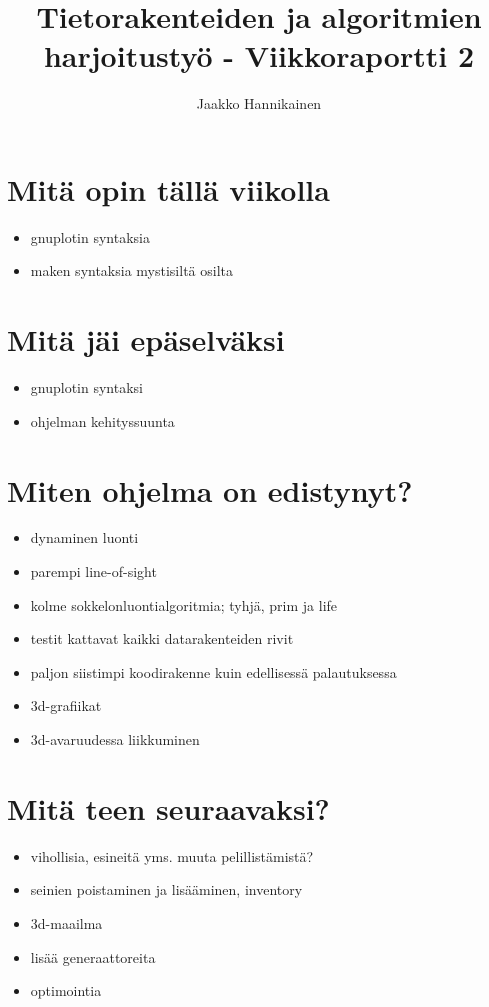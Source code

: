 \documentclass{article}
\author{Jaakko Hannikainen}
\title{Tietorakenteiden ja algoritmien harjoitustyö - Viikkoraportti 2}
\begin{document}
\maketitle

\section{Mitä opin tällä viikolla}
\begin{itemize}
    \item gnuplotin syntaksia
    \item maken syntaksia mystisiltä osilta
\end{itemize}

\section{Mitä jäi epäselväksi}
\begin{itemize}
    \item gnuplotin syntaksi
    \item ohjelman kehityssuunta
\end{itemize}

\section{Miten ohjelma on edistynyt?}
\begin{itemize}
    \item dynaminen luonti
    \item parempi line-of-sight
    \item kolme sokkelonluontialgoritmia; tyhjä, prim ja life
    \item testit kattavat kaikki datarakenteiden rivit
    \item paljon siistimpi koodirakenne kuin edellisessä palautuksessa
    \item 3d-grafiikat
    \item 3d-avaruudessa liikkuminen
\end{itemize}

\section{Mitä teen seuraavaksi?}
\begin{itemize}
    \item vihollisia, esineitä yms. muuta pelillistämistä?
    \item seinien poistaminen ja lisääminen, inventory
    \item 3d-maailma
    \item lisää generaattoreita
    \item optimointia
\end{itemize}
\end{document}
